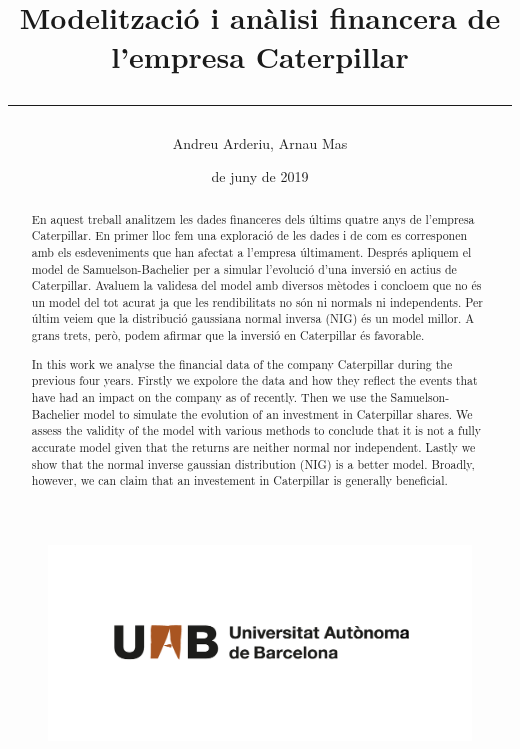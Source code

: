 \documentclass{article}
\title{\sffamily \bfseries Modelització i anàlisi financera de l'empresa Caterpillar \vspace{1em} \hrule}
\author{\sffamily Andreu Arderiu, Arnau Mas}
\date{\sffamily 14 de juny de 2019}
\numberwithin{table}{section}
\numberwithin{figure}{section}
\numberwithin{equation}{section}
\begin{document}
\begin{titlepage}
	\clearpage
	\thispagestyle{empty}
	\maketitle	

	\renewcommand{\abstractname}{\bfseries \sffamily Resum:}
	\begin{abstract}
		En aquest treball analitzem les dades financeres dels últims quatre anys de l'empresa Caterpillar. En primer lloc fem una exploració de les dades i de com es corresponen amb els esdeveniments que han afectat a l'empresa últimament. Després apliquem el model de Samuelson-Bachelier per a simular l'evolució d'una inversió en actius de Caterpillar. Avaluem la validesa del model amb diversos mètodes i concloem que no és un model del tot acurat ja que les rendibilitats no són ni normals ni independents. Per últim veiem que la distribució gaussiana normal inversa (NIG) és un model millor. A grans trets, però, podem afirmar que la inversió en Caterpillar és favorable. 
	\end{abstract}

	\renewcommand{\abstractname}{\bfseries \sffamily Abstract:}
	\begin{abstract}
		In this work we analyse the financial data of the company Caterpillar during the previous four years. Firstly we expolore the data and how they reflect the events that have had an impact on the company as of recently. Then we use the Samuelson-Bachelier model to simulate the evolution of an investment in Caterpillar shares. We assess the validity of the model with various methods to conclude that it is not a fully accurate model given that the returns are neither normal nor independent. Lastly we show that the normal inverse gaussian distribution (NIG) is a better model. Broadly, however, we can claim that an investement in Caterpillar is generally beneficial.
	\end{abstract}

	\begin{figure}[b]
		\thispagestyle{empty}
		\center \includegraphics[scale = 0.3]{uab}
	\end{figure}
\end{titlepage}
\end{document}
